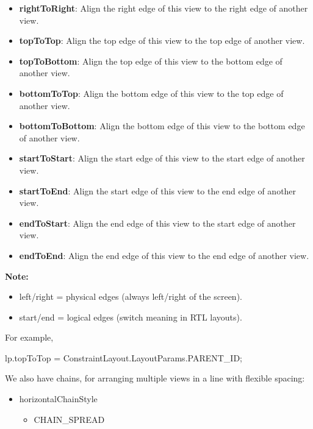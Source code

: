 \documentclass{report}
\begin{document}
\begin{itemize}
\begin{itemize}
                \item \textbf{rightToRight}: Align the right edge of this view to the right edge of another view.
                \item \textbf{topToTop}: Align the top edge of this view to the top edge of another view.
                \item \textbf{topToBottom}: Align the top edge of this view to the bottom edge of another view.
                \item \textbf{bottomToTop}: Align the bottom edge of this view to the top edge of another view.
                \item \textbf{bottomToBottom}: Align the bottom edge of this view to the bottom edge of another view.
                \item \textbf{startToStart}: Align the start edge of this view to the start edge of another view.
                \item \textbf{startToEnd}: Align the start edge of this view to the end edge of another view.
                \item \textbf{endToStart}: Align the end edge of this view to the start edge of another view.
                \item \textbf{endToEnd}: Align the end edge of this view to the end edge of another view.
            \end{itemize}
            \bigbreak \noindent 
            \textbf{Note:}
            \begin{itemize}
                \item left/right = physical edges (always left/right of the screen).
                \item start/end = logical edges (switch meaning in RTL layouts).
            \end{itemize}
            \bigbreak \noindent 
            For example,
            \bigbreak \noindent 
            \begin{javacode}
            lp.topToTop = ConstraintLayout.LayoutParams.PARENT_ID;
            \end{javacode}
            \bigbreak \noindent 
            We also have chains, for arranging multiple views in a line with flexible spacing:
            \begin{itemize}
                \item horizontalChainStyle
                    \begin{itemize}
                        \item CHAIN\_SPREAD

\end{itemize}
\end{itemize}
\end{itemize}
\end{document}
